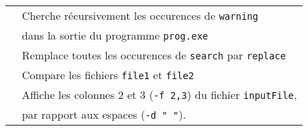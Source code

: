 \documentclass [a4paper]{article}
\begin{document}
\begin{tabular}{ ll }
\hspace{0.5cm}{\verb+./prog.exe | grep -nr "warning" ./+} & Cherche récursivement les occurences de \verb+warning+\\
                                                          & dans la sortie du programme \verb+prog.exe+\\
\hspace{0.5cm}{\verb+sed "s/search/replace/g" inputFile+} & Remplace toutes les occurences de \verb+search+ par \verb+replace+\\
\hspace{0.5cm}{\verb+diff file1 file2+}                   & Compare les fichiers \verb+file1+ et \verb+file2+\\
\hspace{0.5cm}{\verb+cut -d " " -f 2,3 inputFile+}        & Affiche les colonnes 2 et 3 (\verb+-f 2,3+) du fichier \verb+inputFile+, \\
                                                          & par rapport aux espaces (\verb+-d " "+). \\


\end{tabular}
\end{document}
